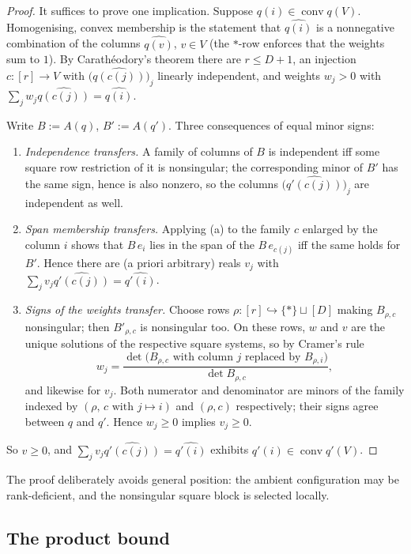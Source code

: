 \documentclass[11pt,a4paper]{article}
\theoremstyle{plain}
\theoremstyle{definition}
\DeclareMathOperator{\conv}{conv}
\begin{document}
\begin{proof}
It suffices to prove one implication. Suppose $q(i)\in\conv q(V)$. Homogenising, convex
membership is the statement that $\widehat{q(i)}$ is a nonnegative combination of the
columns $\widehat{q(v)}$, $v\in V$ (the $\ast$-row enforces that the weights sum to $1$).
By Carathéodory's theorem there are $r\le D+1$, an injection
$c\colon[r]\to V$ with $\bigl(\widehat{q(c(j))}\bigr)_j$ linearly independent, and weights
$w_j>0$ with $\sum_j w_j\widehat{q(c(j))}=\widehat{q(i)}$.

Write $B:=A(q)$, $B':=A(q')$. Three consequences of equal minor signs:
\begin{enumerate}
\item[(a)] \emph{Independence transfers.} A family of columns of $B$ is independent iff some
square row restriction of it is nonsingular; the corresponding minor of $B'$ has the same
sign, hence is also nonzero, so the columns $\bigl(\widehat{q'(c(j))}\bigr)_j$ are
independent as well.
\item[(b)] \emph{Span membership transfers.} Applying (a) to the family $c$ enlarged by the
column $i$ shows that $B\,e_i$ lies in the span of the $B\,e_{c(j)}$ iff the same
holds for $B'$. Hence there are (a priori arbitrary) reals $v_j$ with
$\sum_j v_j\widehat{q'(c(j))}=\widehat{q'(i)}$.
\item[(c)] \emph{Signs of the weights transfer.} Choose rows $\rho\colon[r]\hookrightarrow
\{\ast\}\sqcup[D]$ making $B_{\rho,c}$ nonsingular; then $B'_{\rho,c}$ is nonsingular too.
On these rows, $w$ and $v$ are the unique solutions of the respective square systems, so by
Cramer's rule
\[
  w_j=\frac{\det\bigl(B_{\rho,c}\text{ with column }j\text{ replaced by }B_{\rho,i}\bigr)}
           {\det B_{\rho,c}},
\]
and likewise for $v_j$. Both numerator and denominator are minors of the family indexed by
$(\rho,\,c\text{ with }j\mapsto i)$ and $(\rho,c)$ respectively; their signs agree between
$q$ and $q'$. Hence $w_j\ge0$ implies $v_j\ge0$.
\end{enumerate}
So $v\ge0$, and $\sum_j v_j\widehat{q'(c(j))}=\widehat{q'(i)}$ exhibits
$q'(i)\in\conv q'(V)$.
\end{proof}

The proof deliberately avoids general position: the ambient configuration may be
rank-deficient, and the nonsingular square block is selected locally.

\subsection{The product bound}
\end{document}
